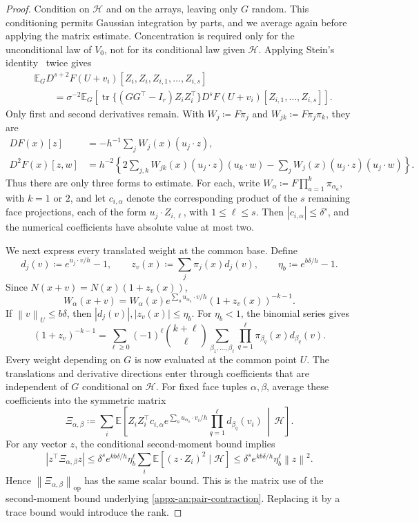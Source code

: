 \documentclass[11pt,letterpaper]{article}
\theoremstyle{remark}
\newcommand{\E}{\mathbb E}
\newcommand{\tr}{\operatorname{tr}}
\newcommand{\op}{\mathrm{op}}
\newcommand{\norm}[1]{\left\lVert#1\right\rVert}
\begin{document}
\begin{proof}
Condition on \(\mathcal H\) and on the arrays, leaving only \(G\)
random. This conditioning permits Gaussian integration by parts,
and we average again before applying the matrix estimate. Concentration
is required only for the unconditional law of \(V_0\), not for its
conditional law given \(\mathcal H\). Applying Stein's
identity~\cite{Stein1981} twice gives
\begin{align*}
 &\E_G D^{s+2}F(U+v_i)[Z_i,Z_i,Z_{i,1},\ldots,Z_{i,s}]\\
 &\qquad=\sigma^{-2}\E_G\left[
       \tr\{(GG^\top-I_r)Z_iZ_i^\top\}
       D^sF(U+v_i)[Z_{i,1},\ldots,Z_{i,s}]\right].
\end{align*}
Only first and second derivatives remain. With
\(W_j\coloneqq F\pi_j\) and \(W_{jk}\coloneqq F\pi_j\pi_k\), they are
\begin{align*}
 DF(x)[z]&=-h^{-1}\sum_jW_j(x)(u_j\cdot z),\\
 D^2F(x)[z,w]&=h^{-2}\left\{
       2\sum_{j,k}W_{jk}(x)(u_j\cdot z)(u_k\cdot w)
       -\sum_jW_j(x)(u_j\cdot z)(u_j\cdot w)\right\}.
\end{align*}
Thus there are only three forms to estimate. For each, write
\(W_\alpha\coloneqq F\prod_{a=1}^k\pi_{\alpha_a}\), with \(k=1\) or \(2\),
and let \(c_{i,\alpha}\) denote the corresponding product of the
{
\(s\) remaining face projections, each of the form
\(u_j\cdot Z_{i,\ell}\), with \(1\le\ell\le s\).
Then \(|c_{i,\alpha}|\le\delta^s\),
}
and the numerical coefficients have absolute value at most two.

We next express every translated weight at the common base. {Define}
\[
 d_j(v)\coloneqq e^{u_j\cdot v/h}-1,\qquad
 z_v(x)\coloneqq \sum_j\pi_j(x)d_j(v),\qquad
 \eta_b\coloneqq e^{b\delta/h}-1.
\]
Since \(N(x+v)=N(x)(1+z_v(x))\),
\begin{equation}
 W_\alpha(x+v)=W_\alpha(x)
 e^{\sum_a u_{\alpha_a}\cdot v/h}(1+z_v(x))^{-k-1}.
 \label{eq:weight-translation}
\end{equation}
If \(\norm v_U\le b\delta\), then \(|d_j(v)|,|z_v(x)|\le\eta_b\).
For \(\eta_b<1\), the binomial series gives
\[
 (1+z_v)^{-k-1}
 =\sum_{\ell\ge0}(-1)^\ell\binom{k+\ell}{\ell}
       \sum_{\beta_1,\ldots,\beta_\ell}
       \prod_{q=1}^\ell\pi_{\beta_q}(x)d_{\beta_q}(v).
\]
Every weight depending on \(G\) is now evaluated at the common
point \(U\). The translations and derivative directions enter through
coefficients that are independent of \(G\) conditional on
\(\mathcal H\). For fixed face tuples \(\alpha,\beta\), average
these coefficients into the symmetric matrix
\[
 \Xi_{\alpha,\beta}\coloneqq \sum_i\E\left[
 Z_iZ_i^\top c_{i,\alpha}
 e^{\sum_a u_{\alpha_a}\cdot v_i/h}
 \prod_{q=1}^\ell d_{\beta_q}(v_i)\,\middle|\,\mathcal H\right].
\]
For any vector \(z\), the conditional second-moment bound implies
\[
 |z^\top\Xi_{\alpha,\beta}z|
 \le\delta^s e^{kb\delta/h}\eta_b^\ell
       \sum_i\E[(z\cdot Z_i)^2\mid\mathcal H]
 \le\delta^s e^{kb\delta/h}\eta_b^\ell\norm z^2.
\]
Hence \(\norm{\Xi_{\alpha,\beta}}_\op\) has the same scalar bound.
This is the matrix use of the second-moment bound underlying
\eqref{appx-an:pair-contraction}. Replacing it by a trace bound
would introduce the rank.


\end{proof}
\end{document}
